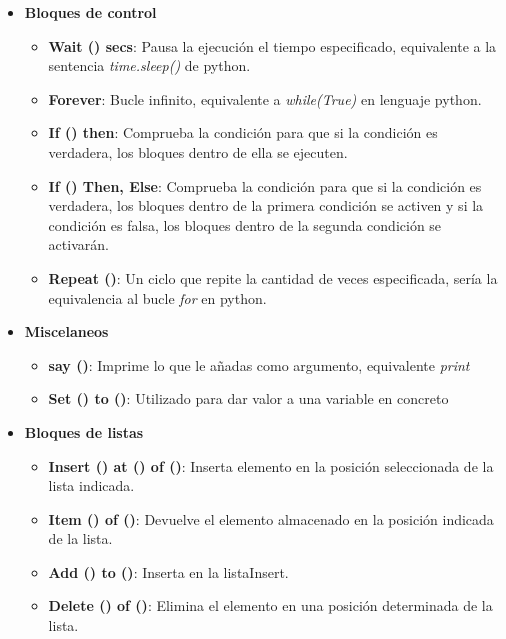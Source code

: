 \begin{itemize}
\item \textbf{Bloques de control}
\begin{itemize}
\item \textbf{Wait () secs}: Pausa la ejecución el tiempo especificado, equivalente a la sentencia \textit{time.sleep()} de python.
\item \textbf{Forever}: Bucle infinito, equivalente a \textit{while(True)} en lenguaje python.
\item \textbf{If () then}: Comprueba la condición para que si la condición es verdadera, los bloques dentro de ella se ejecuten.
\item \textbf{If () Then, Else}: Comprueba la condición para que si la condición es verdadera, los bloques dentro de la primera condición se activen y si la condición es falsa, los bloques dentro de la segunda condición se activarán.
\item \textbf{Repeat ()}: Un ciclo que repite la cantidad de veces especificada, sería la equivalencia al bucle \textit{for} en python.
\end{itemize}
\item \textbf{Miscelaneos}
\begin{itemize}

\item \textbf{say ()}: Imprime lo que le añadas como argumento, equivalente  \textit{print}
\item \textbf{Set () to ()}: Utilizado para dar valor a una variable en concreto
\end{itemize}

\item \textbf{Bloques de listas}
\begin{itemize}

\item \textbf{Insert () at () of ()}: Inserta elemento en la posición seleccionada de la lista indicada.
\item \textbf{Item () of ()}: Devuelve el elemento almacenado en la posición indicada de la lista.
\item \textbf{Add () to ()}: Inserta en la listaInsert.
\item \textbf{Delete () of ()}: Elimina el elemento en una posición determinada de la lista.
\end{itemize}
\end{itemize}


